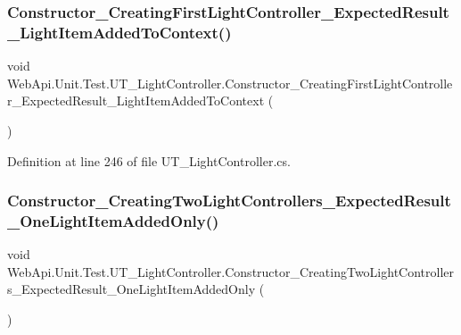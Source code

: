 \subsubsection{\texorpdfstring{Constructor\+\_\+\+Creating\+First\+Light\+Controller\+\_\+\+Expected\+Result\+\_\+\+Light\+Item\+Added\+To\+Context()}{Constructor\_CreatingFirstLightController\_ExpectedResult\_LightItemAddedToContext()}}
{\footnotesize\ttfamily void Web\+Api.\+Unit.\+Test.\+U\+T\+\_\+\+Light\+Controller.\+Constructor\+\_\+\+Creating\+First\+Light\+Controller\+\_\+\+Expected\+Result\+\_\+\+Light\+Item\+Added\+To\+Context (\begin{DoxyParamCaption}{ }\end{DoxyParamCaption})}



Definition at line 246 of file U\+T\+\_\+\+Light\+Controller.\+cs.

\mbox{\label{class_web_api_1_1_unit_1_1_test_1_1_u_t___light_controller_ae0d32217f4e0806eee274d64d9bf9fd4}} 
\subsubsection{\texorpdfstring{Constructor\+\_\+\+Creating\+Two\+Light\+Controllers\+\_\+\+Expected\+Result\+\_\+\+One\+Light\+Item\+Added\+Only()}{Constructor\_CreatingTwoLightControllers\_ExpectedResult\_OneLightItemAddedOnly()}}
{\footnotesize\ttfamily void Web\+Api.\+Unit.\+Test.\+U\+T\+\_\+\+Light\+Controller.\+Constructor\+\_\+\+Creating\+Two\+Light\+Controllers\+\_\+\+Expected\+Result\+\_\+\+One\+Light\+Item\+Added\+Only (\begin{DoxyParamCaption}{ }\end{DoxyParamCaption})}



